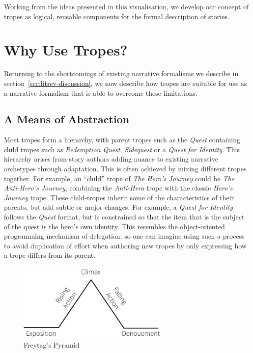 \documentclass[11pt]{report}
\begin{document}
Working from the ideas presented in this visualisation, we develop our concept of tropes as
logical, reusable components for the formal description of stories. 

\section{Why Use Tropes?}

Returning to the shortcomings of existing narrative formalisms we describe in
section~\ref{sec:litrev-discussion}, we now describe how tropes are suitable for use
as a narrative formalism that is able to overcome these limitations.

\subsection{A Means of Abstraction}
\label{sec:abstraction}
Most tropes form a hierarchy, with parent tropes such as the
\emph{Quest} containing child tropes such as \emph{Redemption Quest},
\emph{Sidequest} or a \emph{Quest for Identity}. This hierarchy arises from
story authors adding nuance to existing narrative archetypes through adaptation.
This is often achieved by mixing different tropes together. For example, an
``child'' trope of \emph{The Hero's Journey} could be \emph{The Anti-Hero's
  Journey}, combining the \emph{Anti-Hero} trope with the classic \emph{Hero's
  Journey} trope.
These child-tropes inherit some
of the characteristics of their parents, but add subtle or major changes. For
example, a \emph{Quest for Identity} follows the \emph{Quest} format, but is
constrained so that the item that is the subject of the quest is the hero's own
identity. This resembles the object-oriented programming mechanism of delegation, so one can imagine using
such a process to avoid duplication of effort when authoring new tropes by only
expressing how a trope differs from its parent.

\begin{figure}[!t]
\centerline{\includegraphics[height=1.5in]{freytag.png}}
\caption{Freytag's Pyramid} \label{fig:freytag}
\end{figure}
\end{document}
